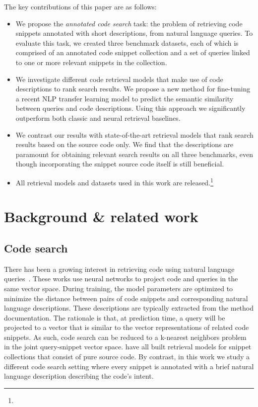 \documentclass[12pt,conference, onecolumn]{IEEEtran}
\begin{document}
The key contributions of this paper are as follows:
\begin{itemize}
\item We propose the \emph{annotated code search} task: the problem of retrieving code snippets annotated with short descriptions, from natural language queries. To evaluate this task, we created three benchmark datasets, each of which is comprised of an annotated code snippet collection and a set of queries linked to one or more relevant snippets in the collection.
\item We investigate different code retrieval models that make use of code descriptions to rank search results. We propose a new method for fine-tuning a recent NLP transfer learning model to predict the semantic similarity between queries and code descriptions. Using this approach we significantly outperform both classic and neural retrieval baselines.
\item We contrast our results with state-of-the-art retrieval models that rank search results based on the source code only. We find that the descriptions are paramount for obtaining relevant search results on all three benchmarks, even though incorporating the snippet source code itself is still beneficial.
\item  All retrieval models and datasets used in this work are released.\footnote{\repourl}
\end{itemize} 
\section{Background \& related work}

\subsection{Code search}
There has been a growing interest in retrieving code using natural language queries~\cite{gu2018deep, sachdev2018retrieval, cambronero2019deep, husain2019codesearchnet, yao2019coacor, Zhangyin:20}.  These works use neural networks to project code and queries in the same vector space. During training, the model parameters are optimized to minimize the distance between pairs of code snippets and corresponding natural language descriptions. These descriptions are typically extracted from the method documentation. The rationale is that, at prediction time, a query will be projected to a vector that is similar to the vector representations of related code snippets. As such, code search can be reduced to a k-nearest neighbors problem in the joint query-snippet vector space. \citet{gu2018deep, sachdev2018retrieval, cambronero2019deep, husain2019codesearchnet, yao2019coacor, Zhangyin:20} have all built retrieval models for snippet collections that consist of pure source code. By contrast, in this work we study a different code search setting where every snippet is annotated with a brief natural language description
describing the code's intent.
\end{document}
